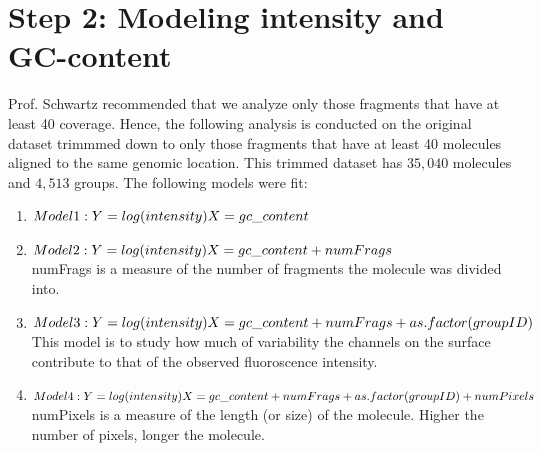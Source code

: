 \documentclass[11pt]{article}
\begin{document}
\section{Step 2: Modeling intensity and GC-content}
Prof. Schwartz recommended that we analyze only those fragments that have at least 40 coverage. Hence, the following analysis is conducted on the original dataset trimmmed down to only those fragments that have at least 40 molecules aligned to the same genomic location. This trimmed dataset has $35,040$ molecules and $4,513$ groups. The following models were fit:
\begin{enumerate}
\item
$Model1:\\ Y = log(intensity) \\ X = gc\_content$
\item
$Model2:\\ Y = log(intensity) \\ X = gc\_content + numFrags$ \\
numFrags is a measure of the number of fragments the molecule was divided into.
\item
$Model3:\\ Y = log(intensity) \\ X = gc\_content + numFrags + as.factor(groupID)$ \\
This model is to study how much of variability the channels on the surface contribute to that of the observed fluoroscence intensity.
\item
$Model4:\\ Y = log(intensity) \\ X = gc\_content + numFrags + as.factor(groupID) + numPixels$ \\
numPixels is a measure of the length (or size) of the molecule. Higher the number of pixels, longer the molecule. 
\end{enumerate}
\end{document}
